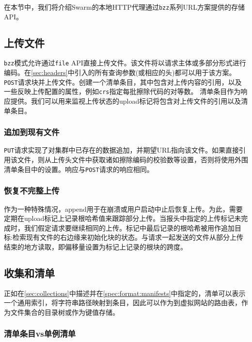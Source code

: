 \green{}


在本节中，我们将介绍Swarm的本地HTTP代理通过\lstinline{bzz}系列URL方案提供的存储API。

\subsection{上传文件\statusgreen}\label{sec:file-api}

\lstinline{bzz}模式允许通过\lstinline{file} API直接上传文件。该文件将以请求主体或多部分形式进行编码。在\ref{sec:headers}中引入的所有查询参数(或相应的头)都可以用于该方案。\lstinline{POST}请求块并上传文件。创建一个清单条目，其中包含对上传内容的引用，以及一些反映上传配置的属性，例如\lstinline{crs}指定每批擦除代码的对等数。
清单条目作为响应提供。我们可以用来监视上传状态的upload标记将包含对上传文件的引用以及清单条目。

\subsubsection{追加到现有文件}\label{sec:append}

\lstinline{PUT}请求实现了对集群中已存在的数据追加，并期望URL指向该文件。如果直接引用该文件，则从上传头文件中获取诸如擦除编码的校验数等设置，否则将使用外围清单条目中的设置。响应与\lstinline{POST}请求的响应相同。


\subsubsection{恢复不完整上传}\label{sec:resume}

作为一种特殊情况，append用于在崩溃或用户启动中止后恢复上传。为此，需要定期在upload标记上记录根哈希值来跟踪部分上传。当报头中指定的上传标记未完成时，我们假定请求要继续相同的上传。标记中最后记录的根哈希被用作追加目标:检索现有文件的右边缘来初始化块的状态。与请求一起发送的文件从部分上传结束的地方读取，即偏移量设置为标记上记录的根块的跨度。

\subsection{收集和清单\statusgreen}\label{sec:manifests-ux}

正如在\ref{sec:collections}中描述并在\ref{spec:format:manifests}中指定的，清单可以表示一个通用索引，将字符串路径映射到条目，因此可以作为到虚拟网站的路由表，作为文件集合的目录树或作为键值存储。 

\subsubsection{清单条目vs单例清单}

